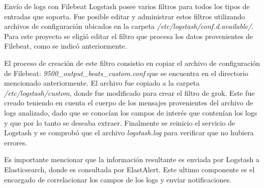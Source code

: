 \begin{section}{Envío de logs con Filebeat}
    Logstash posee varios filtros para todos los tipos de entradas que soporta. 
    Fue posible editar y administrar estos filtros utilizando archivos de configuración ubicados en la carpeta \textit{/etc/logstash/conf.d.available/}. Para este proyecto se eligió editar el filtro que procesa los datos provenientes de Filebeat, como se indicó anteriormente.\par
    El proceso de creación de este filtro consistio en copiar el archivo de configuración de Filebeat: \textit{9500\_output\_beats\_custom.conf} que se encuentra en el directorio mencionado anteriormente. El archivo fue copiado a la carpeta \textit{/etc/logstash/custom}, donde fue modificado para crear el filtro de grok. Este fue creado teniendo en cuenta el cuerpo de los mensajes provenientes del archivo de logs analizado, dado que se conocían los campos de interés que contenían los logs y que por lo tanto se deseaba extraer. Finalmente se reinicio el servicio de Logstash y se comprobó que el archivo \textit{logstash.log} para verificar que no hubiera errores.\par
    Es importante mencionar que la información resultante es enviada por Logstash a Elasticsearch, donde es consultada por ElastAlert. Este ultimo componente es el encargado de correlacionar los campos de los logs y enviar notificaciones.

    \end{section}
    
